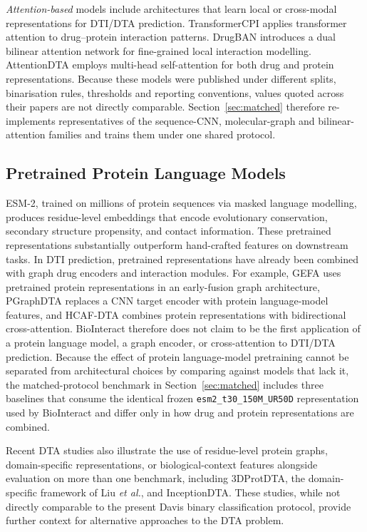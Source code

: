\documentclass[fleqn,10pt]{wlscirep}
\begin{document}
\emph{Attention-based} models include architectures that learn local or
cross-modal representations for DTI/DTA prediction.
TransformerCPI\cite{chen2020transformercpi} applies transformer attention to
drug--protein interaction patterns.  DrugBAN\cite{bai2023drugban} introduces
a dual bilinear attention network for fine-grained local interaction modelling.
AttentionDTA\cite{zhao2022attentiondta} employs multi-head self-attention for
both drug and protein representations.
Because these models were published under different splits, binarisation rules,
thresholds and reporting conventions, values quoted across their papers are not
directly comparable.  Section~\ref{sec:matched} therefore re-implements
representatives of the sequence-CNN, molecular-graph and bilinear-attention
families and trains them under one shared protocol.

\subsection{Pretrained Protein Language Models}

ESM-2,\cite{lin2023evolutionary} trained on millions of protein sequences
via masked language modelling, produces residue-level embeddings that encode
evolutionary conservation, secondary structure propensity, and contact
information.  These pretrained representations substantially outperform
hand-crafted features on downstream tasks.\cite{rives2021biological}  In DTI
prediction, pretrained representations have already been combined with graph
drug encoders and interaction modules.  For example, GEFA uses pretrained
protein representations in an early-fusion graph architecture,\cite{nguyen2022gefa}
PGraphDTA replaces a CNN target encoder with protein language-model features,
\cite{bal2023pgraphdta} and HCAF-DTA combines protein representations with
bidirectional cross-attention.\cite{li2025hcafdta}  BioInteract therefore does
not claim to be the first application of a protein language model, a graph
encoder, or cross-attention to DTI/DTA prediction.
Because the effect of protein language-model pretraining cannot be separated
from architectural choices by comparing against models that lack it, the
matched-protocol benchmark in Section~\ref{sec:matched} includes three
baselines that consume the identical frozen \texttt{esm2\_t30\_150M\_UR50D}
representation used by BioInteract and differ only in how drug and protein
representations are combined.

Recent DTA studies also illustrate the use of residue-level protein graphs,
domain-specific representations, or biological-context features alongside
evaluation on more than one benchmark, including 3DProtDTA,\cite{voitsitskyi2023_3dprotdta}
the domain-specific framework of Liu \textit{et al.},\cite{liu2024domainspecific}
and InceptionDTA.\cite{kalemati2025inceptiondta}
These studies, while not directly comparable to the present Davis binary
classification protocol, provide further context for alternative approaches to
the DTA problem.
\end{document}
